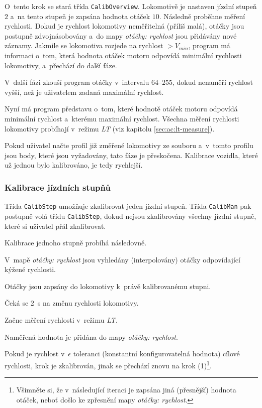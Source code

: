 O~tento krok se stará třída \texttt{CalibOverview}.  Lokomotivě je nastaven
jízdní stupeň $2$ a~na tento stupeň je zapsána hodnota otáček $10$. Následně
proběhne měření rychlosti. Dokud je rychlost lokomotivy neměřitelná (příliš
malá), otáčky jsou postupně zdvojnásobovány a~do mapy \textit{otáčky: rychlost}
jsou přidávány nové záznamy. Jakmile se lokomotiva rozjede na rychlost $>
V_{min}$, program má informaci o~tom, která hodnota otáček motoru odpovídá
minimální rychlosti lokomotivy, a~přechází do další fáze.

V~další fázi zkouší program otáčky v~intervalu $64$--$255$, dokud nenaměří
rychlost vyšší, než je uživatelem zadaná maximální rychlost.

Nyní má program představu o~tom, které hodnotě otáček motoru odpovídá minimální
rychlost a~kterému maximální rychlost. Všechna měření rychlosti lokomotivy
probíhají v~režimu \textit{\gls{LT}} (viz kapitolu \ref{sec:ac:lt-measure}).

Pokud uživatel načte profil již změřené lokomotivy ze souboru a~v~tom\-to
profilu jsou body, které jsou vyžadovány, tato fáze je přeskočena. Kalibrace
vozidla, které už jednou bylo kalibrováno, je tedy rychlejší.

\subsubsection{Kalibrace jízdních stupňů}

Třída \texttt{CalibStep} umožňuje zkalibrovat jeden jízdní stupeň. Třída
\texttt{CalibMan} pak postupně volá třídu \texttt{CalibStep}, dokud nejsou
zkalibrovány všechny jízdní stupně, které si uživatel přál zkalibrovat.

Kalibrace jednoho stupně probíhá následovně.

\begin{compactenum}
\item V~mapě \textit{otáčky: rychlost} jsou vyhledány (interpolovány) otáčky
      odpovídající kýžené rychlosti.
\item Otáčky jsou zapsány do lokomotivy k~právě kalibrovanému stup\-ni.
\item Čeká se $2$~s na změnu rychlosti lokomotivy.
\item Začne měření rychlosti v~režimu \textit{\gls{LT}}.
\item Naměřená hodnota je přidána do mapy \textit{otáčky: rychlost}.
\item Pokud je rychlost v~$\epsilon$ toleranci (konstantní konfigurovatelná hodnota)
      cílové rychlosti, krok je zkalibrován, jinak se přechází znovu na krok
      (1)\footnote{Všimněte si, že v~následující iteraci je zapsána jiná (přesnější)
      hodnota otáček, neboť došlo ke zpřesnění mapy \textit{otáčky: rychlost}.}.
\end{compactenum}

